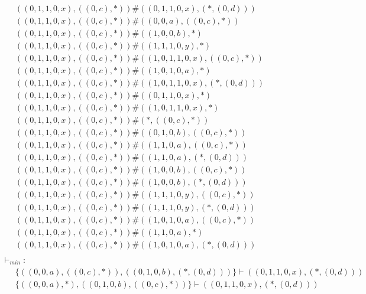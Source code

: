 \begin{align*}
	 & \qquad ((0, 1, 1, 0, x), ((0, c), *)) \# ((0, 1, 1, 0, x), (*, (0, d))) \\ 
	 & \qquad ((0, 1, 1, 0, x), ((0, c), *)) \# ((0, 0, a), ((0, c), *)) \\ 
	 & \qquad ((0, 1, 1, 0, x), ((0, c), *)) \# ((1, 0, 0, b), *) \\ 
	 & \qquad ((0, 1, 1, 0, x), ((0, c), *)) \# ((1, 1, 1, 0, y), *) \\ 
	 & \qquad ((0, 1, 1, 0, x), ((0, c), *)) \# ((1, 0, 1, 1, 0, x), ((0, c), *)) \\ 
	 & \qquad ((0, 1, 1, 0, x), ((0, c), *)) \# ((1, 0, 1, 0, a), *) \\ 
	 & \qquad ((0, 1, 1, 0, x), ((0, c), *)) \# ((1, 0, 1, 1, 0, x), (*, (0, d))) \\ 
	 & \qquad ((0, 1, 1, 0, x), ((0, c), *)) \# ((0, 1, 1, 0, x), *) \\ 
	 & \qquad ((0, 1, 1, 0, x), ((0, c), *)) \# ((1, 0, 1, 1, 0, x), *) \\ 
	 & \qquad ((0, 1, 1, 0, x), ((0, c), *)) \# (*, ((0, c), *)) \\ 
	 & \qquad ((0, 1, 1, 0, x), ((0, c), *)) \# ((0, 1, 0, b), ((0, c), *)) \\ 
	 & \qquad ((0, 1, 1, 0, x), ((0, c), *)) \# ((1, 1, 0, a), ((0, c), *)) \\ 
	 & \qquad ((0, 1, 1, 0, x), ((0, c), *)) \# ((1, 1, 0, a), (*, (0, d))) \\ 
	 & \qquad ((0, 1, 1, 0, x), ((0, c), *)) \# ((1, 0, 0, b), ((0, c), *)) \\ 
	 & \qquad ((0, 1, 1, 0, x), ((0, c), *)) \# ((1, 0, 0, b), (*, (0, d))) \\ 
	 & \qquad ((0, 1, 1, 0, x), ((0, c), *)) \# ((1, 1, 1, 0, y), ((0, c), *)) \\ 
	 & \qquad ((0, 1, 1, 0, x), ((0, c), *)) \# ((1, 1, 1, 0, y), (*, (0, d))) \\ 
	 & \qquad ((0, 1, 1, 0, x), ((0, c), *)) \# ((1, 0, 1, 0, a), ((0, c), *)) \\ 
	 & \qquad ((0, 1, 1, 0, x), ((0, c), *)) \# ((1, 1, 0, a), *) \\ 
	 & \qquad ((0, 1, 1, 0, x), ((0, c), *)) \# ((1, 0, 1, 0, a), (*, (0, d))) \\ 
	 & \ \  & \\ 
	 & \ \ \vdash_{{min}}: & \\ 
	 & \qquad \{ ((0, 0, a), ((0, c), *)), ((0, 1, 0, b), (*, (0, d))) \} \vdash ((0, 1, 1, 0, x), (*, (0, d))) \\ 
	 & \qquad \{ ((0, 0, a), *), ((0, 1, 0, b), ((0, c), *)) \} \vdash ((0, 1, 1, 0, x), (*, (0, d))) \\ 

\end{align*}
